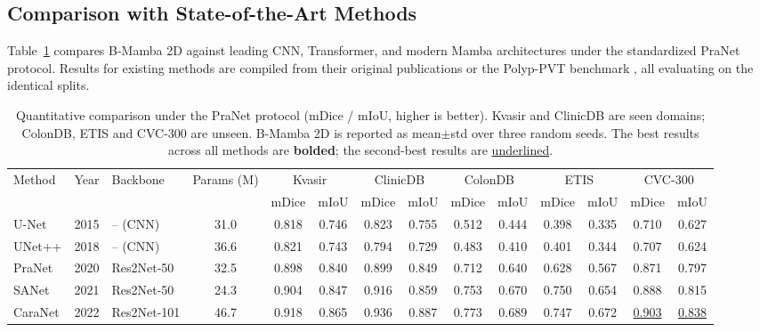 \documentclass[journal]{IEEEtran}
\begin{document}
\subsection{Comparison with State-of-the-Art Methods}
Table~\ref{tab:sota} compares B-Mamba 2D against leading CNN, Transformer, and modern Mamba architectures under the standardized PraNet protocol. Results for existing methods are compiled from their original publications or the Polyp-PVT benchmark \cite{dong2023polyppvt}, all evaluating on the identical splits.

\begin{table}[t]
\centering
\caption{Quantitative comparison under the PraNet protocol (mDice / mIoU, higher is better). Kvasir and ClinicDB are seen domains; ColonDB, ETIS and CVC-300 are unseen. B-Mamba 2D is reported as mean$\pm$std over three random seeds. The best results across all methods are \textbf{bolded}; the second-best results are \underline{underlined}.}
\label{tab:sota}
\begin{adjustbox}{max width=\textwidth}
\begin{tabular}{l c l c cc cc cc cc cc}
\toprule
\multirow{2}{*}{Method} & \multirow{2}{*}{Year} & \multirow{2}{*}{Backbone} & \multirow{2}{*}{Params (M)} & \multicolumn{2}{c}{Kvasir} & \multicolumn{2}{c}{ClinicDB} & \multicolumn{2}{c}{ColonDB} & \multicolumn{2}{c}{ETIS} & \multicolumn{2}{c}{CVC-300} \\
\cmidrule(lr){5-6}\cmidrule(lr){7-8}\cmidrule(lr){9-10}\cmidrule(lr){11-12}\cmidrule(lr){13-14}
 & & & & mDice & mIoU & mDice & mIoU & mDice & mIoU & mDice & mIoU & mDice & mIoU \\
\midrule
U-Net \cite{ronneberger2015unet}        & 2015 & -- (CNN)        & 31.0  & 0.818 & 0.746 & 0.823 & 0.755 & 0.512 & 0.444 & 0.398 & 0.335 & 0.710 & 0.627 \\
UNet++ \cite{zhou2018unetpp}            & 2018 & -- (CNN)        & 36.6  & 0.821 & 0.743 & 0.794 & 0.729 & 0.483 & 0.410 & 0.401 & 0.344 & 0.707 & 0.624 \\
PraNet \cite{fan2020pranet}             & 2020 & Res2Net-50      & 32.5  & 0.898 & 0.840 & 0.899 & 0.849 & 0.712 & 0.640 & 0.628 & 0.567 & 0.871 & 0.797 \\
SANet \cite{wei2021sanet}               & 2021 & Res2Net-50      & 24.3  & 0.904 & 0.847 & 0.916 & 0.859 & 0.753 & 0.670 & 0.750 & 0.654 & 0.888 & 0.815 \\
CaraNet \cite{lou2022caranet}           & 2022 & Res2Net-101     & 46.7  & 0.918 & 0.865 & 0.936 & 0.887 & 0.773 & 0.689 & 0.747 & 0.672 & \underline{0.903} & \underline{0.838} \\

\end{tabular}
\end{adjustbox}
\end{table}
\end{document}
